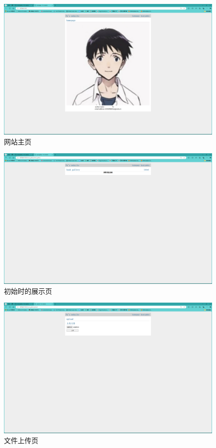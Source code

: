 \begin{figure}[!htbp]
    \centering
    \includegraphics[width=\textwidth]{figures/homepage.png}
    \caption{网站主页}\label{homepage}
\end{figure}
\begin{figure}[!htbp]
    \centering
    \includegraphics[width=\textwidth]{figures/gallery_init.png}
    \caption{初始时的展示页}\label{gallery_init}
\end{figure}
\begin{figure}[!htbp]
    \centering
    \includegraphics[width=\textwidth]{figures/upload.png}
    \caption{文件上传页}\label{upload}
\end{figure}
